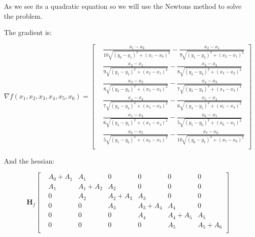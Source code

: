 \documentclass[10pt, a4paper]{article}		%
\theoremstyle{plain}
\theoremstyle{definition}
\begin{document}
As we see its a quadratic equation so we will use the Newtons method to solve the problem.

The gradient is:

\begin{equation*}
    \nabla f (x_1, x_2, x_3, x_4, x_5, x_6) = \left[
    \begin{aligned}
        &   \frac{x_1 - x_0}{10\sqrt{(y_0 - y_1)^2 + (x_1 - x_0)^2}}
            - \frac{x_2 - x_1}{9\sqrt{(y_1 - y_2)^2 + (x_2 - x_1)^2}}\\
        &   \frac{x_2 - x_1}{9\sqrt{(y_1 - y_2)^2 + (x_2 - x_1)^2}}
            - \frac{x_3 - x_2}{8\sqrt{(y_2 - y_3)^2 + (x_3 - x_2)^2}}\\
        &   \frac{x_3 - x_2}{8\sqrt{(y_2 - y_3)^2 + (x_3 - x_2)^2}}
            - \frac{x_4 - x_3}{7\sqrt{(y_3 - y_4)^2 + (x_4 - x_3)^2}}\\
        &   \frac{x_4 - x_3}{7\sqrt{(y_3 - y_4)^2 + (x_4 - x_3)^2}}
            - \frac{x_5 - x_4}{6\sqrt{(y_4 - y_5)^2 + (x_5 - x_4)^2}}\\
        &   \frac{x_5 - x_4}{6\sqrt{(y_4 - y_5)^2 + (x_5 - x_4)^2}}
            - \frac{x_6 - x_5}{5\sqrt{(y_5 - y_6)^2 + (x_6 - x_5)^2}}\\
        &   \frac{x_6 - x_5}{5\sqrt{(y_5 - y_6)^2 + (x_6 - x_5)^2}}
            - \frac{x_7 - x_6}{10\sqrt{(y_6 - y_7)^2 + (x_7 - x_6)^2}}\\
    \end{aligned}
    \right]
\end{equation*}

And the hessian:

\begin{equation*}
    \mathbf{H}_f
    \begin{bmatrix}
        & A_0 + A_1
        & A_1
        & 0
        & 0
        & 0
        & 0
        \\

        & A_1
        & A_1 + A_2
        & A_2
        & 0
        & 0
        & 0
        \\

        & 0
        & A_2
        & A_2 + A_3
        & A_3
        & 0
        & 0
        \\

        & 0
        & 0
        & A_3
        & A_3 + A_4
        & A_4
        & 0
        \\

        & 0
        & 0
        & 0
        & A_4
        & A_4 + A_5
        & A_5
        \\

        & 0
        & 0
        & 0
        & 0
        & A_5
        & A_5 + A_6
        \\

    \end{bmatrix}
\end{equation*}
\end{document}
